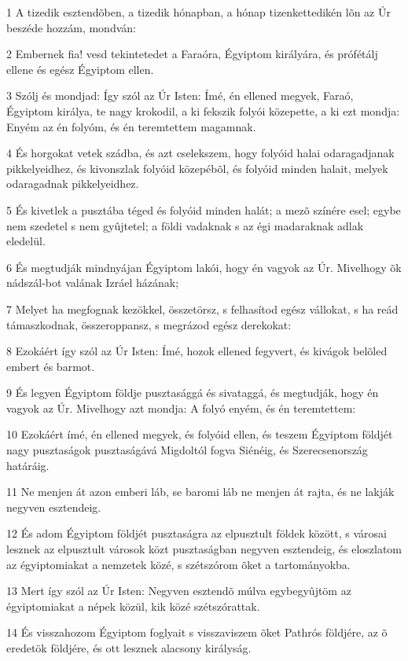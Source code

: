 \par 1 A tizedik esztendõben, a tizedik hónapban, a hónap tizenkettedikén lõn az Úr beszéde hozzám, mondván:
\par 2 Embernek fia! vesd tekintetedet a Faraóra, Égyiptom királyára, és prófétálj ellene és egész Égyiptom ellen.
\par 3 Szólj és mondjad: Így szól az Úr Isten: Ímé, én ellened megyek, Faraó, Égyiptom királya, te nagy krokodil, a ki fekszik folyói közepette, a ki ezt mondja: Enyém az én folyóm, és én teremtettem magamnak.
\par 4 És horgokat vetek szádba, és azt cselekszem, hogy folyóid halai odaragadjanak pikkelyeidhez, és kivonszlak folyóid közepébõl, és folyóid minden halait, melyek odaragadnak pikkelyeidhez.
\par 5 És kivetlek a pusztába téged és folyóid minden halát; a mezõ színére esel; egybe nem szedetel s nem gyûjtetel; a földi vadaknak s az égi madaraknak adlak eledelül.
\par 6 És megtudják mindnyájan Égyiptom lakói, hogy én vagyok az Úr. Mivelhogy õk nádszál-bot valának Izráel házának;
\par 7 Melyet ha megfognak kezökkel, összetörsz, s felhasítod egész vállokat, s ha reád támaszkodnak, összeroppansz, s megrázod egész derekokat:
\par 8 Ezokáért így szól az Úr Isten: Ímé, hozok ellened fegyvert, és kivágok belõled embert és barmot.
\par 9 És legyen Égyiptom földje pusztasággá és sivataggá, és megtudják, hogy én vagyok az Úr. Mivelhogy azt mondja: A folyó enyém, és én teremtettem:
\par 10 Ezokáért ímé, én ellened megyek, és folyóid ellen, és teszem Égyiptom földjét nagy pusztaságok pusztaságává Migdoltól fogva Siénéig, és Szerecsenország határáig.
\par 11 Ne menjen át azon emberi láb, se baromi láb ne menjen át rajta, és ne lakják negyven esztendeig.
\par 12 És adom Égyiptom földjét pusztaságra az elpusztult földek között, s városai lesznek az elpusztult városok közt pusztaságban negyven esztendeig, és eloszlatom az égyiptomiakat a nemzetek közé, s szétszórom õket a tartományokba.
\par 13 Mert így szól az Úr Isten: Negyven esztendõ múlva egybegyûjtöm az égyiptomiakat a népek közül, kik közé szétszórattak.
\par 14 És visszahozom Égyiptom foglyait s visszaviszem õket Pathrós földjére, az õ eredetök földjére, és ott lesznek alacsony királyság.
